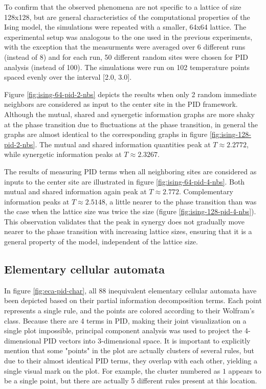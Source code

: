 \documentclass[12pt]{article}
\begin{document}
To confirm that the observed phenomena are not specific to a lattice of size 128x128, but are general characteristics of the computational properties of the Ising model, the simulations were repeated with a smaller, 64x64 lattice. The experimental setup was analogous to the one used in the previous experiments, with the exception that the measurments were averaged over 6 different runs (instead of 8) and for each run, 50 different random sites were chosen for PID analysis (instead of 100). The simulations were run on 102 temperature points spaced evenly over the interval [2.0, 3.0].

Figure \ref{fig:ising-64-pid-2-nbs} depicts the results when only 2 random immediate neighbors are considered as input to the center site in the PID framework. Although the mutual, shared and synergetic information graphs are more shaky at the phase transition due to fluctuations at the phase transition, in general the graphs are almost identical to the corresponding graphs in figure \ref{fig:ising-128-pid-2-nbs}. The mutual and shared information quantities peak at $T \approx 2.2772$, while synergetic information peaks at $T \approx 2.3267$.

The results of measuring PID terms when all neighboring sites are considered as inputs to the center site are illustrated in figure \ref{fig:ising-64-pid-4-nbs}. Both mutual and shared information again peak at $T \approx 2.772$. Complementary information peaks at $T \approx 2.5148$, a little nearer to the phase transition than was the case when the lattice size was twice the size (figure \ref{fig:ising-128-pid-4-nbs}). This observation validates that the peak in synergy does not gradually move nearer to the phase transition with increasing lattice sizes, ensuring that it is a general property of the model, independent of the lattice size.

\subsection{Elementary cellular automata}

In figure \ref{fig:eca-pid-char}, all 88 inequivalent elementary cellular automata have been depicted based on their partial information decomposition terms. Each point represents a single rule, and the points are colored according to their Wolfram's class. Because there are 4 terms in PID, making their joint visualization on a single plot impossible, principal component analysis was used to project the 4-dimensional PID vectors into 3-dimensional space. It is important to explicitly mention that some "points" in the plot are actually clusters of several rules, but due to their almost identical PID terms, they overlap with each other, yielding a single visual mark on the plot.  For example, the cluster numbered as $1$ appears to be a single point, but there are actually 5 different rules present at this location.   
\end{document}
